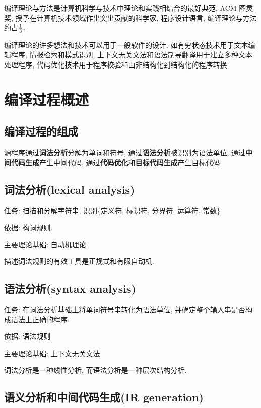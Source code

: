         编译理论与方法是计算机科学与技术中理论和实践相结合的最好典范. ACM 图灵奖, 授予在计算机技术领域作出突出贡献的科学家, 程序设计语言, 编译理论与方法约占$1\over 3$.

        编译理论的许多想法和技术可以用于一般软件的设计. 如有穷状态技术用于文本编辑程序, 情报检索和模式识别, 上下文无关文法和语法制导翻译用于建立多种文本处理程序, 代码优化技术用于程序校验和由非结构化到结构化的程序转换.

\section{编译过程概述}

    \subsection{编译过程的组成}

        源程序通过\textbf{词法分析}分解为单词和符号, 通过\textbf{语法分析}被识别为语法单位, 通过\textbf{中间代码生成}产生中间代码, 通过\textbf{代码优化}和\textbf{目标代码生成}产生目标代码.

    \subsection{词法分析(lexical analysis)}

        任务: 扫描和分解字符串, 识别\{定义符, 标识符, 分界符, 运算符, 常数\}

        依据: 构词规则.

        主要理论基础: 自动机理论.

        描述词法规则的有效工具是正规式和有限自动机.

    \subsection{语法分析(syntax analysis)}

        任务: 在词法分析基础上将单词符号串转化为语法单位, 并确定整个输入串是否构成语法上正确的程序.

        依据: 语法规则

        主要理论基础: 上下文无关文法

        词法分析是一种线性分析, 而语法分析是一种层次结构分析.

    \subsection{语义分析和中间代码生成(IR generation)}

